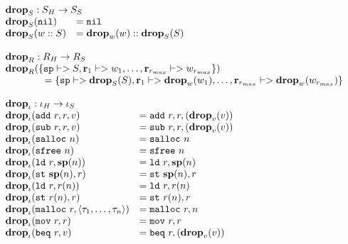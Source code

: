 {\[\begin{array}{l}
\begin{array}{ll}
\rlap{$\drop{S} : \high S -> \simple{S}$} \\
\drop{S}(\mathtt{nil}) &= \mathtt{nil} \\
\drop{S}(w :: S) &= \drop{w}(w) :: \drop{S}(S) \\
\end{array} \\\\

\begin{array}{l}
\drop{R} : \high R -> \simple{R} \\
\drop{R}(\{\mathtt{sp} |-> S, \mathbf{r}_1 |-> w_1, \dots, \mathbf{r}_{r_{max}} |-> w_{r_{max}}\})\\
\quad\quad\quad\quad = \{\mathtt{sp} |-> \drop{S}(S), \mathbf{r}_1 |-> \drop{w}(w_1), \dots, \mathbf{r}_{r_{max}} |-> \drop{w}(w_{r_{max}})\}
\end{array} \\\\

\begin{array}{ll}
\rlap{$\drop{\iota} : \high\iota -> \simple\iota$} \\
\drop{\iota}(\mathtt{add}\ r, r, v) &= \mathtt{add}\ r, r, (\drop{v}(v)) \\
\drop{\iota}(\mathtt{sub}\ r, r, v) &= \mathtt{sub}\ r, r, (\drop{v}(v)) \\
\drop{\iota}(\mathtt{salloc}\ n) &= \mathtt{salloc}\ n \\
\drop{\iota}(\mathtt{sfree}\ n) &= \mathtt{sfree}\ n \\
\drop{\iota}(\mathtt{ld}\ r, \mathbf{sp}(n)) &= \mathtt{ld}\ r, \mathbf{sp}(n) \\
\drop{\iota}(\mathtt{st}\ \mathbf{sp}(n), r) &= \mathtt{st}\ \mathbf{sp}(n), r \\
\drop{\iota}(\mathtt{ld}\ r, r(n)) &= \mathtt{ld}\ r, r(n) \\
\drop{\iota}(\mathtt{st}\ r(n), r) &= \mathtt{st}\ r(n), r \\
\drop{\iota}(\mathtt{malloc}\ r, \langle \tau_1, \dots, \tau_n \rangle) &= \mathtt{malloc}\ r, n \\
\drop{\iota}(\mathtt{mov}\ r, r) &= \mathtt{mov}\ r, r \\
\drop{\iota}(\mathtt{beq}\ r, v) &= \mathtt{beq}\ r, (\drop{v}(v)) \\
\end{array} \\\\


\end{array}\]}
